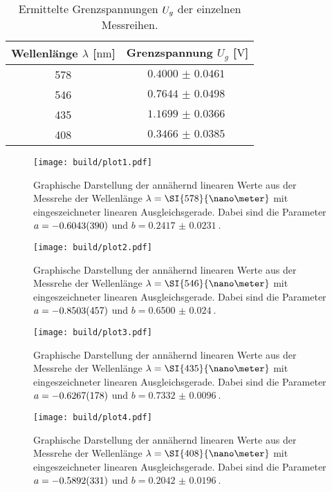 \begin{table}
    \caption{Ermittelte Grenzspannungen $\protect U_{g}$ der einzelnen Messreihen.}
    \centering
    \label{tab:ugrenz}
    \begin{tabular}{c c}
        \toprule
        Wellenlänge $\lambda$ [$\si{\nano\meter}$] & Grenzspannung $U_{g}$ [$\si{\volt}$] \\
        \midrule
        578 & $\SI{0.4000(461)}{}$\\
        546 & $\SI{0.7644(498)}{}$\\
        435 & $\SI{1.1699(366)}{}$\\
        408 & $\SI{0.3466(385)}{}$\\
        \bottomrule    
    \end{tabular}
\end{table}

\begin{figure}
    \centering
    \texttt{[image: build/plot1.pdf]}
    \caption{Graphische Darstellung der annähernd linearen Werte aus der Messrehe der Wellenlänge $\protect \lambda = \SI{578}{\nano\meter}$ mit eingeszeichneter linearen Ausgleichsgerade. Dabei sind die Parameter $\protect a = \SI{-0.6043(390)}{}$ und $b = \SI{0.2417(231)}{}$.} 
    \label{fig:gelb}
\end{figure}

\begin{figure}
    \centering
    \texttt{[image: build/plot2.pdf]}
    \caption{Graphische Darstellung der annähernd linearen Werte aus der Messrehe der Wellenlänge $\protect \lambda = \SI{546}{\nano\meter}$ mit eingeszeichneter linearen Ausgleichsgerade. Dabei sind die Parameter $\protect a = \SI{-0.8503(457)}{}$ und $b = \SI{0.6500(240)}{}$.} 
    \label{fig:grün}
\end{figure}

\begin{figure}
    \centering
    \texttt{[image: build/plot3.pdf]}
    \caption{Graphische Darstellung der annähernd linearen Werte aus der Messrehe der Wellenlänge $\protect \lambda = \SI{435}{\nano\meter}$ mit eingeszeichneter linearen Ausgleichsgerade. Dabei sind die Parameter $\protect a = \SI{-0.6267(178)}{}$ und $b = \SI{0.7332(96)}{}$.} 
    \label{fig:violet}
\end{figure}

\begin{figure}
    \centering
    \texttt{[image: build/plot4.pdf]}
    \caption{Graphische Darstellung der annähernd linearen Werte aus der Messrehe der Wellenlänge $\protect \lambda = \SI{408}{\nano\meter}$ mit eingeszeichneter linearen Ausgleichsgerade. Dabei sind die Parameter $\protect a = \SI{-0.5892(331)}{}$ und $b = \SI{0.2042(196)}{}$.} 
    \label{fig:GIGAviolet}
\end{figure}
\newpage

